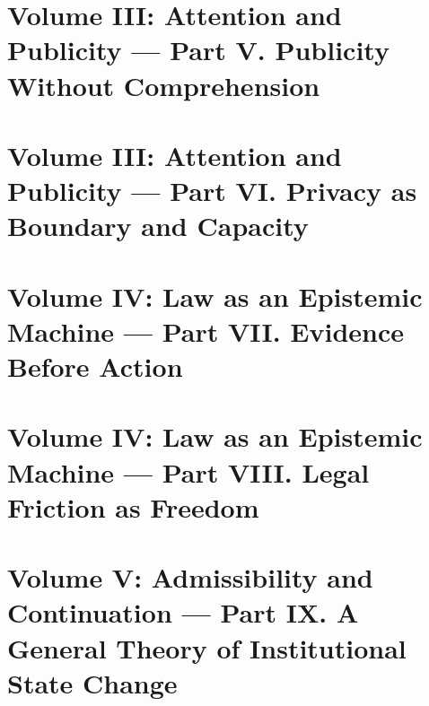 \documentclass[11pt]{book}
\begin{document}
\part{Volume III: Attention and Publicity --- Part V. Publicity Without Comprehension}







\part{Volume III: Attention and Publicity --- Part VI. Privacy as Boundary and Capacity}









\part{Volume IV: Law as an Epistemic Machine --- Part VII. Evidence Before Action}







\part{Volume IV: Law as an Epistemic Machine --- Part VIII. Legal Friction as Freedom}









\part{Volume V: Admissibility and Continuation --- Part IX. A General Theory of Institutional State Change}







\end{document}
